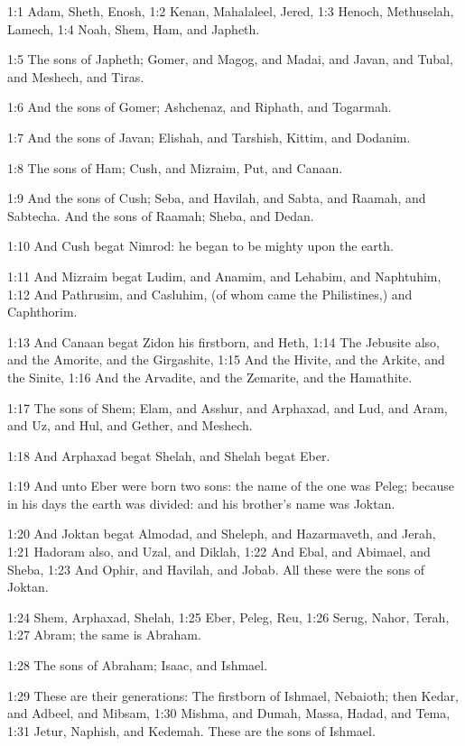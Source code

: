 

1:1 Adam, Sheth, Enosh, 1:2 Kenan, Mahalaleel, Jered, 1:3 Henoch, Methuselah, Lamech, 1:4 Noah, Shem, Ham, and Japheth.

1:5 The sons of Japheth; Gomer, and Magog, and Madai, and Javan, and Tubal, and Meshech, and Tiras.

1:6 And the sons of Gomer; Ashchenaz, and Riphath, and Togarmah.

1:7 And the sons of Javan; Elishah, and Tarshish, Kittim, and Dodanim.

1:8 The sons of Ham; Cush, and Mizraim, Put, and Canaan.

1:9 And the sons of Cush; Seba, and Havilah, and Sabta, and Raamah, and Sabtecha. And the sons of Raamah; Sheba, and Dedan.

1:10 And Cush begat Nimrod: he began to be mighty upon the earth.

1:11 And Mizraim begat Ludim, and Anamim, and Lehabim, and Naphtuhim, 1:12 And Pathrusim, and Casluhim, (of whom came the Philistines,) and Caphthorim.

1:13 And Canaan begat Zidon his firstborn, and Heth, 1:14 The Jebusite also, and the Amorite, and the Girgashite, 1:15 And the Hivite, and the Arkite, and the Sinite, 1:16 And the Arvadite, and the Zemarite, and the Hamathite.

1:17 The sons of Shem; Elam, and Asshur, and Arphaxad, and Lud, and Aram, and Uz, and Hul, and Gether, and Meshech.

1:18 And Arphaxad begat Shelah, and Shelah begat Eber.

1:19 And unto Eber were born two sons: the name of the one was Peleg; because in his days the earth was divided: and his brother's name was Joktan.

1:20 And Joktan begat Almodad, and Sheleph, and Hazarmaveth, and Jerah, 1:21 Hadoram also, and Uzal, and Diklah, 1:22 And Ebal, and Abimael, and Sheba, 1:23 And Ophir, and Havilah, and Jobab. All these were the sons of Joktan.

1:24 Shem, Arphaxad, Shelah, 1:25 Eber, Peleg, Reu, 1:26 Serug, Nahor, Terah, 1:27 Abram; the same is Abraham.

1:28 The sons of Abraham; Isaac, and Ishmael.

1:29 These are their generations: The firstborn of Ishmael, Nebaioth; then Kedar, and Adbeel, and Mibsam, 1:30 Mishma, and Dumah, Massa, Hadad, and Tema, 1:31 Jetur, Naphish, and Kedemah. These are the sons of Ishmael.

